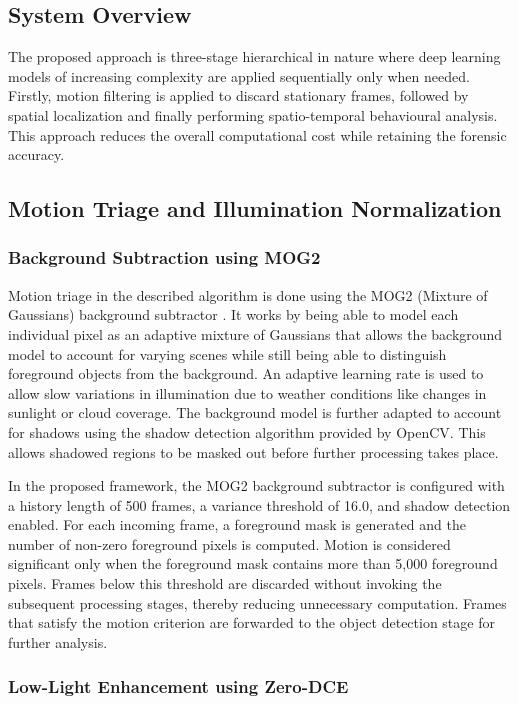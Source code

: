 \documentclass[conference]{IEEEtran}
\begin{document}
\subsection{System Overview}

The proposed approach is three-stage hierarchical in nature where deep learning models of increasing complexity are applied sequentially only when needed. Firstly, motion filtering is applied to discard stationary frames, followed by spatial localization and finally performing spatio-temporal behavioural analysis. This approach reduces the overall computational cost while retaining the forensic accuracy.

\subsection{Motion Triage and Illumination Normalization}
\subsubsection{Background Subtraction using MOG2}

Motion triage in the described algorithm is done using the MOG2 (Mixture of Gaussians) background subtractor \cite{zivkovic2004mog2}. It works by being able to model each individual pixel as an adaptive mixture of Gaussians that allows the background model to account for varying scenes while still being able to distinguish foreground objects from the background. An adaptive learning rate is used to allow slow variations in illumination due to weather conditions like changes in sunlight or cloud coverage. The background model is further adapted to account for shadows using the shadow detection algorithm provided by OpenCV. This allows shadowed regions to be masked out before further processing takes place.

In the proposed framework, the MOG2 background subtractor is configured with a history length of 500 frames, a variance threshold of 16.0, and shadow detection enabled. For each incoming frame, a foreground mask is generated and the number of non-zero foreground pixels is computed. Motion is considered significant only when the foreground mask contains more than 5,000 foreground pixels. Frames below this threshold are discarded without invoking the subsequent processing stages, thereby reducing unnecessary computation. Frames that satisfy the motion criterion are forwarded to the object detection stage for further analysis.

\subsubsection{Low-Light Enhancement using Zero-DCE}
\end{document}
